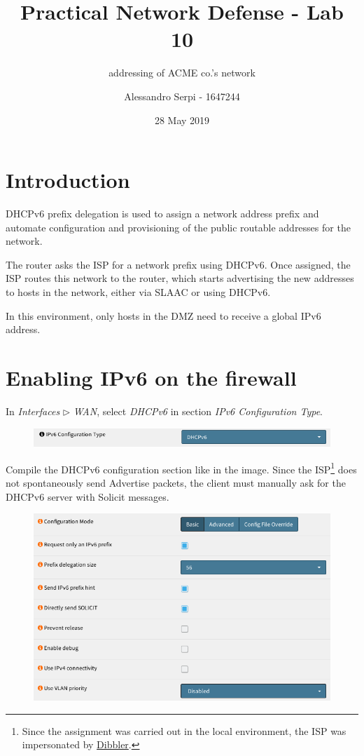 \documentclass{homework}
\title{Practical Network Defense - Lab 10}
\subtitle{\ip addressing of ACME co.’s network}
\author{Alessandro Serpi - 1647244}
\date{28 May 2019}
\newcommand{\dhcp}{DHCPv6\xspace}
\newcommand{\ip}{IPv6\xspace}
\newcommand{\isp}{ISP\xspace}
\begin{document}
    \maketitle
    \tableofcontents
    
    
    \pagebreak
    \section{Introduction}
    DHCPv6 prefix delegation is used to assign a network address prefix and automate configuration and provisioning of the public routable addresses for the network.
    
    The router asks the \isp for a network prefix using \dhcp.
    Once assigned, the \isp routes this network to the router, which starts advertising the new addresses to hosts in the network, either via SLAAC or using DHCPv6.
    
    In this environment, only hosts in the DMZ need to receive a global \ip address.
    
    
    \section{Enabling \ip on the firewall}
    In \textit{Interfaces} $\triangleright$ \textit{WAN}, select \textit{\dhcp} in section \textit{\ip Configuration Type}.
    \begin{figure}[H]
        \centering
        \includegraphics[width=\linewidth]{images/wan-ipv6}
        \label{fig:wan-ipv6}
    \end{figure}
    \vspace{-15pt}
    
    Compile the \dhcp configuration section like in the image.
    Since the \isp\footnote{Since the assignment was carried out in the local environment, the \isp was impersonated by \href{https://klub.com.pl/dhcpv6/}{Dibbler}.} does not spontaneously send Advertise packets, the client must manually ask for the \dhcp server with Solicit messages.
    \begin{figure}[H]
        \centering
        \includegraphics[width=\linewidth]{images/wan-dhcp}
        \label{fig:wan-dhcp}
    \end{figure}
    \vspace{-25pt}
    
\end{document}
